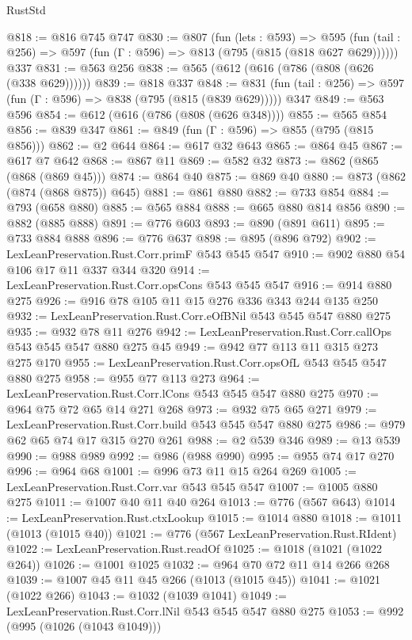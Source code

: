 \begin{lexlean}{RustStd}
\begin{coremodule}
@818 := @816 @745 @747
@830 := @807
    (fun (lets : @593) =>
    @595 (fun (tail : @256) => @597 (fun (Γ : @596) => @813 (@795 (@815 (@818 @627 @629))))))
    @337
@831 := @563 @256
@838 := @565 (@612 (@616 (@786 (@808 (@626 (@338 @629))))))
@839 := @818 @337
@848 := @831 (fun (tail : @256) => @597 (fun (Γ : @596) => @838 (@795 (@815 (@839 @629))))) @347
@849 := @563 @596
@854 := @612 (@616 (@786 (@808 (@626 @348))))
@855 := @565 @854
@856 := @839 @347
@861 := @849 (fun (Γ : @596) => @855 (@795 (@815 @856)))
@862 := @2 @644
@864 := @617 @32 @643
@865 := @864 @45
@867 := @617 @7 @642
@868 := @867 @11
@869 := @582 @32
@873 := @862 (@865 (@868 (@869 @45)))
@874 := @864 @40
@875 := @869 @40
@880 := @873 (@862 (@874 (@868 @875)) @645)
@881 := @861 @880
@882 := @733 @854
@884 := @793 (@658 @880)
@885 := @565 @884
@888 := @665 @880 @814 @856
@890 := @882 (@885 @888)
@891 := @776 @603
@893 := @890 (@891 @611)
@895 := @733 @884 @888
@896 := @776 @637
@898 := @895 (@896 @792)
@902 := LexLeanPreservation.Rust.Corr.primF @543 @545 @547
@910 := @902 @880 @54 @106 @17 @11 @337 @344 @320
@914 := LexLeanPreservation.Rust.Corr.opsCons @543 @545 @547
@916 := @914 @880 @275
@926 := @916 @78 @105 @11 @15 @276 @336 @343 @244 @135 @250
@932 := LexLeanPreservation.Rust.Corr.eOfBNil @543 @545 @547 @880 @275
@935 := @932 @78 @11 @276
@942 := LexLeanPreservation.Rust.Corr.callOps @543 @545 @547 @880 @275 @45
@949 := @942 @77 @113 @11 @315 @273 @275 @170
@955 := LexLeanPreservation.Rust.Corr.opsOfL @543 @545 @547 @880 @275
@958 := @955 @77 @113 @273
@964 := LexLeanPreservation.Rust.Corr.lCons @543 @545 @547 @880 @275
@970 := @964 @75 @72 @65 @14 @271 @268
@973 := @932 @75 @65 @271
@979 := LexLeanPreservation.Rust.Corr.build @543 @545 @547 @880 @275
@986 := @979 @62 @65 @74 @17 @315 @270 @261
@988 := @2 @539 @346
@989 := @13 @539
@990 := @988 @989
@992 := @986 (@988 @990)
@995 := @955 @74 @17 @270
@996 := @964 @68
@1001 := @996 @73 @11 @15 @264 @269
@1005 := LexLeanPreservation.Rust.Corr.var @543 @545 @547
@1007 := @1005 @880 @275
@1011 := @1007 @40 @11 @40 @264
@1013 := @776 (@567 @643)
@1014 := LexLeanPreservation.Rust.ctxLookup
@1015 := @1014 @880
@1018 := @1011 (@1013 (@1015 @40))
@1021 := @776 (@567 LexLeanPreservation.Rust.RIdent)
@1022 := LexLeanPreservation.Rust.readOf
@1025 := @1018 (@1021 (@1022 @264))
@1026 := @1001 @1025
@1032 := @964 @70 @72 @11 @14 @266 @268
@1039 := @1007 @45 @11 @45 @266 (@1013 (@1015 @45))
@1041 := @1021 (@1022 @266)
@1043 := @1032 (@1039 @1041)
@1049 := LexLeanPreservation.Rust.Corr.lNil @543 @545 @547 @880 @275
@1053 := @992 (@995 (@1026 (@1043 @1049)))

\end{coremodule}
\end{lexlean}
